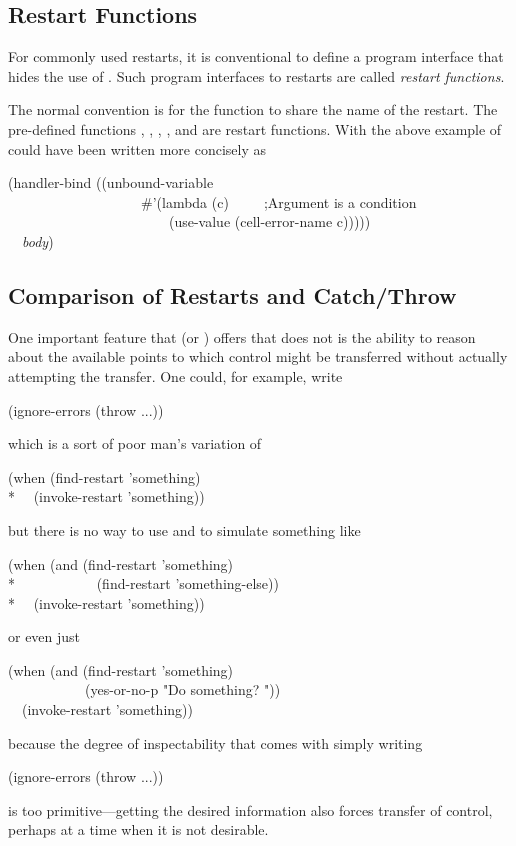 \subsection{Restart Functions}

For commonly used restarts, it is conventional to define a program interface
that hides the use of . Such program interfaces to restarts
are called \emph{restart functions}.

The normal convention is for the function to share the name of the restart.
The pre-defined functions , , , , and
 are restart functions. With  the above example of 
 could have been written more concisely as
\begin{lisp}
(handler-bind ((unbound-variable \\
~~~~~~~~~~~~~~~~~~~\#'(lambda (c)~~~~~;\textrm{Argument  is a condition} \\
~~~~~~~~~~~~~~~~~~~~~~~(use-value (cell-error-name c))))) \\
~~\emph{body})
\end{lisp}

\subsection{Comparison of Restarts and Catch/Throw}
  
One important feature that  (or ) offers that
 does not is the ability to reason about the available points to
which control might be transferred without actually attempting the
transfer. One could, for example, write
\begin{lisp}
(ignore-errors (throw ...))
\end{lisp}
which is a sort of poor man's variation of
\begin{lisp}
(when (find-restart 'something) \\*
~~(invoke-restart 'something))
\end{lisp}
but there is no way to use  and  to simulate something
like
\begin{lisp}
(when (and (find-restart 'something) \\*
~~~~~~~~~~~(find-restart 'something-else)) \\*
~~(invoke-restart 'something))
\end{lisp}
or even just
\begin{lisp}
(when (and (find-restart 'something) \\
~~~~~~~~~~~(yes-or-no-p "Do something? ")) \\
~~(invoke-restart 'something))
\end{lisp}
because the degree of inspectability that comes with simply writing
\begin{lisp}
(ignore-errors (throw ...))
\end{lisp}
is too primitive---getting the desired information also forces
transfer of control, perhaps at a time when it is not desirable.

